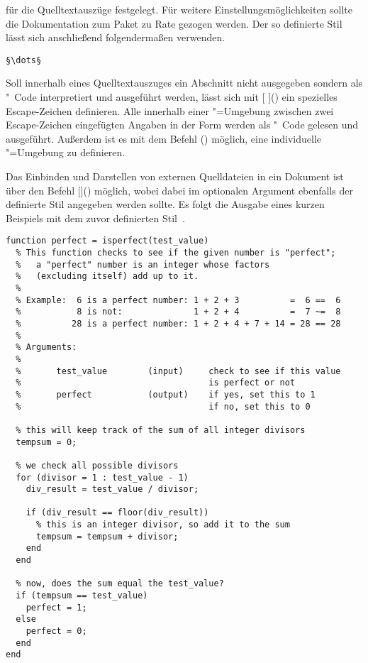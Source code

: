 \documentclass[%
  english,ngerman,%
  cdgeometry=no,DIV=12,automark%
]{tudscrartcl}
\begin{document}
für die Quelltextauszüge festgelegt. Für weitere Einstellungsmöglichkeiten 
sollte die Dokumentation zum Paket zu Rate gezogen werden. Der so definierte 
Stil lässt sich anschließend folgendermaßen verwenden.
%
\begin{Hint}
\begin{lstlisting}[style=matlab]
§\dots§
\end{lstlisting}
\end{Hint}
%
Soll innerhalb eines Quelltextauszuges ein Abschnitt nicht ausgegeben sondern 
als "~Code interpretiert und ausgeführt werden, lässt sich mit 
[%
]() ein spezielles Escape-Zeichen definieren. Alle innerhalb 
einer "=Umgebung zwischen zwei Escape-Zeichen eingefügten 
Angaben in der Form \PValue{\dots} werden als 
"~Code gelesen und ausgeführt. Außerdem ist es mit dem Befehl 
() möglich, eine individuelle 
"=Umgebung zu definieren.

Das Einbinden und Darstellen von externen Quelldateien in ein Dokument ist über 
den Befehl
[\LParameter{}]() 
möglich, wobei dabei im optionalen Argument ebenfalls der definierte Stil 
angegeben werden sollte. Es folgt die Ausgabe eines kurzen Beispiels mit dem 
zuvor definierten Stil~.
%
\begin{lstlisting}[style=matlab]
function perfect = isperfect(test_value)
  % This function checks to see if the given number is "perfect";
  %   a "perfect" number is an integer whose factors 
  %   (excluding itself) add up to it.
  %
  % Example:  6 is a perfect number: 1 + 2 + 3          =  6 ==  6
  %           8 is not:              1 + 2 + 4          =  7 ~=  8
  %          28 is a perfect number: 1 + 2 + 4 + 7 + 14 = 28 == 28
  %
  % Arguments:
  %
  %       test_value        (input)     check to see if this value 
  %                                     is perfect or not
  %       perfect           (output)    if yes, set this to 1
  %                                     if no, set this to 0
  
  % this will keep track of the sum of all integer divisors
  tempsum = 0;
  
  % we check all possible divisors
  for (divisor = 1 : test_value - 1)
    div_result = test_value / divisor;
    
    if (div_result == floor(div_result)) 
      % this is an integer divisor, so add it to the sum
      tempsum = tempsum + divisor;
    end
  end
  
  % now, does the sum equal the test_value?
  if (tempsum == test_value) 
    perfect = 1;
  else
    perfect = 0;
  end
end
\end{lstlisting}
\end{document}
